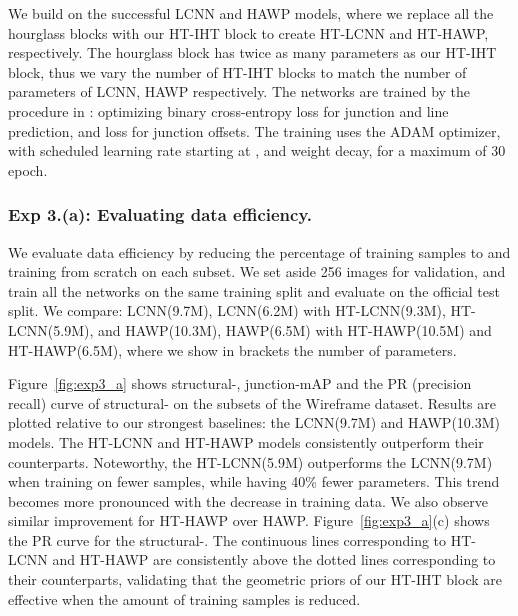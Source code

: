 \documentclass[runningheads]{llncs}
\newcommand{\model}{HT-IHT block\xspace}
\begin{document}
We build on the successful LCNN \cite{zhou2019end} and HAWP \cite{xue2020holistically} models, where we replace all the hourglass blocks with our \model to create HT-LCNN and HT-HAWP, respectively. 
The hourglass block has twice as many parameters as our \model, thus we vary the number of HT-IHT blocks to match the number of parameters of LCNN, HAWP respectively. 
The networks are trained by the procedure in \cite{xue2020holistically,zhou2019learning}: optimizing binary cross-entropy loss for junction and line prediction, and  loss for junction offsets.
The training uses the ADAM optimizer, with scheduled learning rate starting at , and  weight decay, for a maximum of 30 epoch.

\subsubsection{\textbf{Exp 3.(a):} Evaluating data efficiency.}
\label{Exp 3.(a)}

We evaluate data efficiency by reducing the percentage of training samples to   and training from scratch on each subset.  
We set aside 256 images for validation, and train all the networks on the same training split and evaluate on the official test split. 
We compare: LCNN(9.7M), LCNN(6.2M) with HT-LCNN(9.3M), HT-LCNN(5.9M), and HAWP(10.3M), HAWP(6.5M) with HT-HAWP(10.5M) and HT-HAWP(6.5M), where we show in brackets the number of parameters.

Figure~\ref{fig:exp3_a} shows structural-, junction-mAP and the PR (precision recall) curve of structural- on the subsets of the Wireframe dataset.
Results are plotted relative to our strongest baselines: the LCNN(9.7M) and HAWP(10.3M) models.   
The HT-LCNN and HT-HAWP models consistently outperform their counterparts.
Noteworthy, the HT-LCNN(5.9M) outperforms the LCNN(9.7M) when training on fewer samples, while having 40\% fewer parameters.
This trend becomes more pronounced with the decrease in training data. 
We also observe similar improvement for HT-HAWP over HAWP.
Figure~\ref{fig:exp3_a}(c) shows the PR curve for the structural-. 
The continuous lines corresponding to HT-LCNN and HT-HAWP are consistently above the dotted lines corresponding to their counterparts, validating that the geometric priors of our \model are effective when the amount of training samples is reduced.
\end{document}
